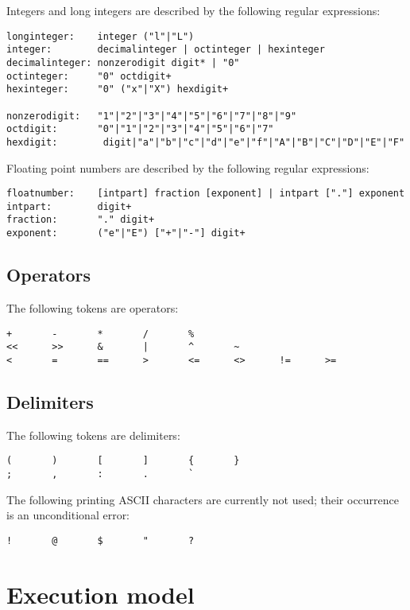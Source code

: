 Integers and long integers are described by the following regular expressions:

\begin{verbatim}
longinteger:    integer ("l"|"L")
integer:        decimalinteger | octinteger | hexinteger
decimalinteger: nonzerodigit digit* | "0"
octinteger:     "0" octdigit+
hexinteger:     "0" ("x"|"X") hexdigit+

nonzerodigit:   "1"|"2"|"3"|"4"|"5"|"6"|"7"|"8"|"9"
octdigit:       "0"|"1"|"2"|"3"|"4"|"5"|"6"|"7"
hexdigit:        digit|"a"|"b"|"c"|"d"|"e"|"f"|"A"|"B"|"C"|"D"|"E"|"F"
\end{verbatim}

Floating point numbers are described by the following regular expressions:

\begin{verbatim}
floatnumber:    [intpart] fraction [exponent] | intpart ["."] exponent
intpart:        digit+
fraction:       "." digit+
exponent:       ("e"|"E") ["+"|"-"] digit+
\end{verbatim}

\section{Operators}

The following tokens are operators:

\begin{verbatim}
+       -       *       /       %
<<      >>      &       |       ^       ~
<       =       ==      >       <=      <>      !=      >=
\end{verbatim}

\section{Delimiters}

The following tokens are delimiters:

\begin{verbatim}
(       )       [       ]       {       }
;       ,       :       .       `
\end{verbatim}

The following printing ASCII characters are currently not used;
their occurrence is an unconditional error:

\begin{verbatim}
!       @       $       "       ?
\end{verbatim}

\chapter{Execution model}

